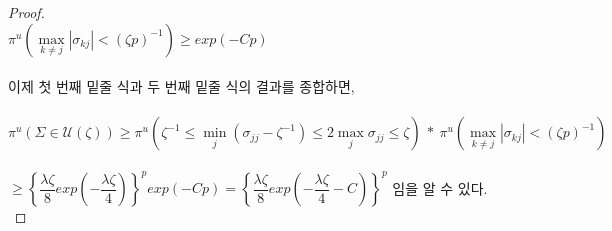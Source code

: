 \begin{proof}
\\
$\pi^u(\max\limits_{k \neq j}|\sigma_{kj}|< (\zeta p)^{-1}) \geq exp(-Cp) $ \\
\\
이제 첫 번째 밑줄 식과 두 번째 밑줄 식의 결과를 종합하면,\\
\\
$\pi^u(\Sigma \in \mathcal{U}(\zeta)) \geq \pi^u(\zeta^{-1}\leq\min\limits_{j}(\sigma_{jj}-\zeta^{-1})\leq 2\max\limits_{j}\sigma_{jj}\leq\zeta) \ * \ \pi^u(\max\limits_{k \neq j}|\sigma_{kj}|< (\zeta p)^{-1})$\\
\\
$\geq \left\{ \dfrac{\lambda \zeta}{8} exp(-\dfrac{\lambda \zeta}{4})\right\}^p exp(-Cp)=\left\{ \dfrac{\lambda \zeta}{8} exp(-\dfrac{\lambda \zeta}{4}-C)\right\}^p$ 임을 알 수 있다.\\








\end{proof}
